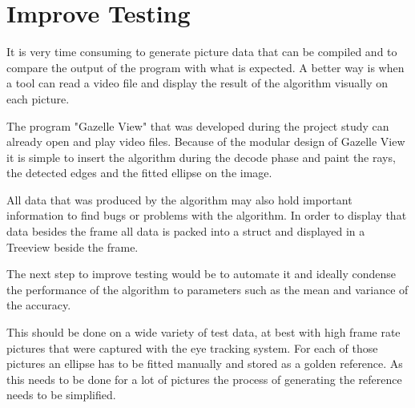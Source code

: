 \section{Improve Testing}
It is very time consuming to generate picture data that can be compiled and to compare the output of the program with what is expected. A better way is when a tool can read a video file and display the result of the algorithm visually on each picture. 

The program "Gazelle View" that was developed during the project study can already open and play video files. Because of the modular design of Gazelle View it is simple to insert the algorithm during the decode phase and paint the rays, the detected edges and the fitted ellipse on the image.

All data that was produced by the algorithm may also hold important information to find bugs or problems with the algorithm. In order to display that data besides the frame all data is packed into a struct and displayed in a Treeview beside the frame. 

The next step to improve testing would be to automate it and ideally condense the performance of the algorithm to parameters such as the mean and variance of the accuracy.

This should be done on a wide variety of test data, at best with high frame rate pictures that were captured with the eye tracking system. For each of those pictures an ellipse has to be fitted manually and stored as a golden reference. As this needs to be done for a lot of pictures the process of generating the reference needs to be simplified.
